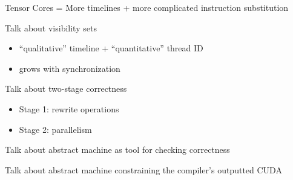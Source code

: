 \newpage
{}

{\large

}

\newpage
{}

{\LARGE

Tensor Cores = More timelines + more complicated instruction substitution

}

\newpage
{}

{\LARGE

Talk about visibility sets
\begin{itemize}
  \item ``qualitative'' timeline + ``quantitative'' thread ID
  \item grows with synchronization
\end{itemize}

Talk about two-stage correctness
\begin{itemize}
  \item Stage 1: rewrite operations
  \item Stage 2: parallelism
\end{itemize}

Talk about abstract machine as tool for checking correctness

Talk about abstract machine constraining the compiler's outputted CUDA

}


